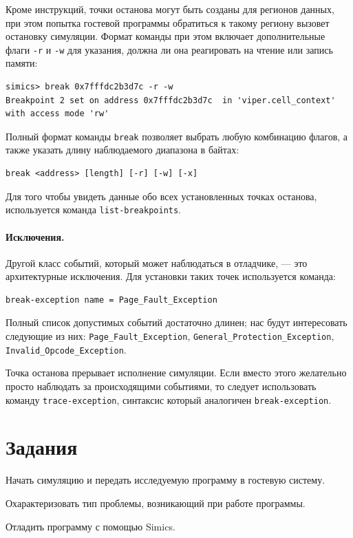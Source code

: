 Кроме инструкций, точки останова могут быть созданы для регионов данных, при этом попытка гостевой программы обратиться к такому региону вызовет остановку симуляции. Формат команды при этом включает дополнительные флаги \texttt{-r} и \texttt{-w} для указания, должна ли она реагировать на чтение или запись памяти:

\begin{lstlisting}
simics> break 0x7fffdc2b3d7c -r -w
Breakpoint 2 set on address 0x7fffdc2b3d7c  in 'viper.cell_context' with access mode 'rw'
\end{lstlisting}

Полный формат команды \texttt{break} позволяет выбрать любую комбинацию флагов, а также указать длину наблюдаемого диапазона в байтах:
\begin{lstlisting}
break <address> [length] [-r] [-w] [-x]
\end{lstlisting}

Для того чтобы увидеть данные обо всех установленных точках останова, используется команда \texttt{list-breakpoints}.

\paragraph{Исключения.}

Другой класс событий, который может наблюдаться в отладчике, --- это архитектурные исключения. Для установки таких точек используется команда:

\begin{lstlisting}
break-exception name = Page_Fault_Exception
\end{lstlisting}

Полный список допустимых событий достаточно длинен; нас будут интересовать следующие из них: \texttt{Page_Fault_Exception}, \texttt{General_Protection_Exception}, \texttt{Invalid_Opcode_Exception}.

Точка останова прерывает исполнение симуляции. Если вместо этого желательно просто наблюдать за происходящими событиями, то следует использовать команду \texttt{trace-exception}, синтаксис который аналогичен \texttt{break-exception}.

\section{Задания}

\begin{enumerate*}

    \item Начать симуляцию и передать исследуемую программу в гостевую систему.
    \item Охарактеризовать тип проблемы, возникающий при работе программы.
    \item Отладить программу с помощью Simics.
\end{enumerate*}

